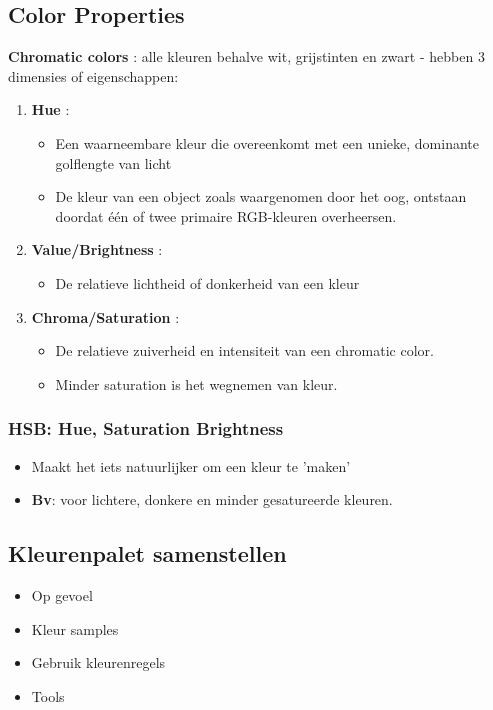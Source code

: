 \documentclass{article}
\newcommand{\bold}[1]{\textbf{#1}}
\begin{document}
\subsection{Color Properties}
\bold{Chromatic colors} : alle kleuren behalve wit, grijstinten en zwart - hebben 3 dimensies of eigenschappen:
\begin{enumerate}
    \item \bold{Hue} : 
    \begin{itemize}
        \item Een waarneembare kleur die overeenkomt met een unieke, dominante golflengte van licht
        \item De kleur van een object zoals waargenomen door het oog, ontstaan doordat één of twee primaire RGB-kleuren overheersen.
    \end{itemize}
    \item \bold{Value/Brightness} :
    \begin{itemize}
        \item De relatieve lichtheid of donkerheid van een kleur
    \end{itemize}
    \item \bold{Chroma/Saturation} : 
    \begin{itemize}
        \item De relatieve zuiverheid en intensiteit van een chromatic color. 
        \item Minder saturation is het wegnemen van kleur.
    \end{itemize}
\end{enumerate}

\subsubsection{HSB: Hue, Saturation Brightness}
\begin{itemize}
    \item Maakt het iets natuurlijker om een kleur te 'maken'
    \item \bold{Bv}: voor lichtere, donkere en minder gesatureerde kleuren.
\end{itemize}

\subsection{Kleurenpalet samenstellen}
\begin{itemize}
    \item Op gevoel
    \item Kleur samples
    \item Gebruik kleurenregels
    \item Tools
\end{itemize}
\end{document}
